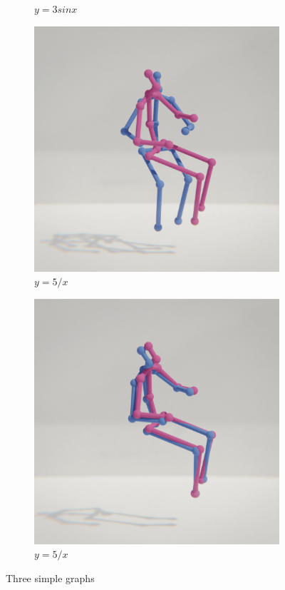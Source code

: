\begin{figure}
\begin{subfigure}[b]{0.2\textwidth}
        \caption{$y=3sinx$}
        \label{fig:three sin x}
    \end{subfigure}
    \hfill
    \begin{subfigure}[b]{0.2\textwidth}
        \centering
        \includegraphics[width=\textwidth]{figures/h36_viz/proc_pos.png}
        \caption{$y=5/x$}
        \label{fig:five over x}
    \end{subfigure}
    \hfill
    \begin{subfigure}[b]{0.2\textwidth}
        \centering
        \includegraphics[width=\textwidth]{figures/h36_viz/proc_rot.png}
        \caption{$y=5/x$}
        \label{fig:five over x}
    \end{subfigure}
    \caption{Three simple graphs}
    \label{fig:procrustes}
\end{figure}

